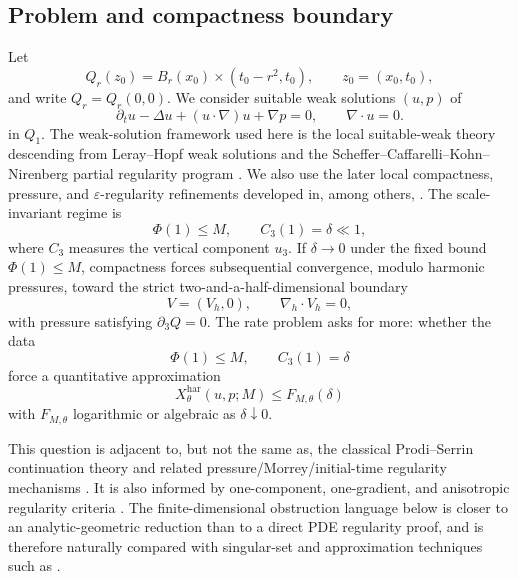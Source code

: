 \documentclass[11pt]{article}
\numberwithin{equation}{section}
\newcommand{\har}{\mathrm{har}}
\begin{document}
\subsection{Problem and compactness boundary}
Let
\[
  Q_r(z_0)=B_r(x_0)\times(t_0-r^2,t_0), \qquad z_0=(x_0,t_0),
\]
and write \(Q_r=Q_r(0,0)\). We consider suitable weak solutions \((u,p)\) of
\begin{equation}\label{eq:NS}
  \partial_t u-\Delta u+(u\cdot\nabla)u+\nabla p=0,\qquad \nabla\cdot u=0.
\end{equation}
in \(Q_1\). The weak-solution framework used here is the local suitable-weak theory descending from Leray--Hopf weak solutions and the Scheffer--Caffarelli--Kohn--Nirenberg partial regularity program \cite{Leray1934,Hopf1951,Scheffer1976,Scheffer1977,CKN1982}.  We also use the later local compactness, pressure, and \(\varepsilon\)-regularity refinements developed in, among others, \cite{Struwe1988,Lin1998,LadyzhenskayaSeregin1999,Seregin2007Local,Seregin2015,Vasseur2007,GustafsonKangTsai2007,GuevaraPhuc2017,AlbrittonBarkerPrange2023}. The scale-invariant regime is
\[
  \Phi(1)\le M,\qquad C_3(1)=\delta\ll1,
\]
where \(C_3\) measures the vertical component \(u_3\). If \(\delta\to0\) under the fixed bound \(\Phi(1)\le M\), compactness forces subsequential convergence, modulo harmonic pressures, toward the strict two-and-a-half-dimensional boundary
\[
  V=(V_h,0),\qquad \nabla_h\cdot V_h=0,
\]
with pressure satisfying \(\partial_3Q=0\). The rate problem asks for more: whether the data
\[
  \Phi(1)\le M,
  \qquad C_3(1)=\delta
\]
force a quantitative approximation
\[
  X^{\har}_\theta(u,p;M)\le F_{M,\theta}(\delta)
\]
with \(F_{M,\theta}\) logarithmic or algebraic as \(\delta\downarrow0\).

This question is adjacent to, but not the same as, the classical Prodi--Serrin continuation theory and related pressure/Morrey/initial-time regularity mechanisms \cite{Prodi1959,Serrin1962,Serrin1963,KozonoSohr1997,SereginSverak2002,EscauriazaSereginSverak2003,Seregin2007Morrey,JiaSverak2014}.  It is also informed by one-component, one-gradient, and anisotropic regularity criteria \cite{PenelPokorny2004,KukavicaZiane2006,KukavicaZiane2007,ZhouPokorny2009,ZhouPokorny2010,CaoTiti2011,CheminZhang2016,CheminZhangZhang2017,KukavicaRusinZiane2017,HanLeiLiZhao2019,KangNguyen2023}.  The finite-dimensional obstruction language below is closer to an analytic-geometric reduction than to a direct PDE regularity proof, and is therefore naturally compared with singular-set and approximation techniques such as \cite{ChoeLewis2000,DuzaarMingione2004}.
\end{document}
